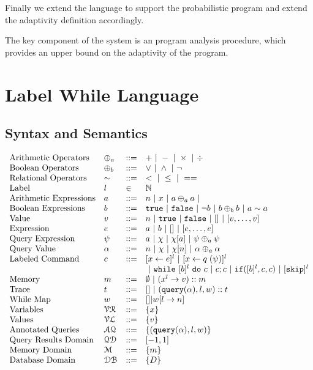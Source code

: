 \documentclass[a4paper,11pt]{article}
\begin{document}
Finally we extend the language to support the probabilistic program and extend the adaptivity definition accordingly.


The key component of the system is an program analysis procedure, which provides an upper bound on the adaptivity of the program.

\section{Label While Language}
\label{sec:while_language}
%
\subsection{Syntax and Semantics}
%
\[
\begin{array}{llll}
 \mbox{Arithmetic Operators} & \oplus_a & ::= & + ~|~ - ~|~ \times 
%
~|~ \div \\  
  \mbox{Boolean Operators} & \oplus_b & ::= & \lor ~|~ \land ~|~ \neg\\
   \mbox{Relational Operators} & \sim & ::= & < ~|~ \leq ~|~ == \\  
   \mbox{Label} & l & \in &  \mathbb{N}  \\  
\mbox{Arithmetic Expressions} & \aexpr & ::= & 
	n ~|~ x ~|~ \aexpr \oplus_a \aexpr ~|~ \\
\mbox{Boolean Expressions} & \bexpr & ::= & 
	\etrue ~|~ \efalse  ~|~ \neg \bexpr
	 ~|~ \bexpr \oplus_b \bexpr
	~|~ \aexpr \sim \aexpr \\
%
\mbox{Value} 
& v & ::= & { n \sep \etrue \sep \efalse ~|~ [] ~|~ [v, \dots, v]}  
\\
%
\mbox{Expression} 
& \expr & ::= & {\aexpr \sep \bexpr ~|~ [] ~|~ [\expr, \dots, \expr]} 
\\
%
\mbox{Query Expression} 
& \qexpr & ::= 
& { \aexpr ~|~ \chi ~|~ \chi[\aexpr] ~|~ \qexpr \oplus_a \qexpr} 
\\
%
\mbox{Query Value} & \qval & ::= 
& { n ~|~ \chi ~|~ \chi[n] ~|~ \qval \oplus_a  \qval }
\\
\mbox{{Labeled Command}} & c & ::= 
	&   [\assign x \expr]^{l} ~|~  [\assign x q(\qexpr)]^{l}
	\\
 	& & & ~|~  \ewhile ~ [b]^l ~ \edo ~ c  ~|~ c;c  ~|~ \eif([\bexpr]^l, c, c) 	 ~|~ [\eskip]^{l} 
 \\
\mbox{Memory} 
& m & ::= & \emptyset ~|~ (x^{l} \to v) :: m 
\\
%
\mbox{Trace} 
& t & ::= & [] ~|~ {{( \query(\qval), l, w) :: t}} 
\\
%
\mbox{While Map}
& w & ::= & {[] |  w[l \to n]}
\\
%
\mbox{Variables} 
& \mathcal{VR}  & ::= & \{ x \}
\\ 
%
\mbox{Values} 
& \mathcal{VL}  & ::= & \{ v \}
\\ 
%
\mbox{Annotated Queries} & \mathcal{AQ}  & 
::= & {\{( \query(\qval), l, w) \} } 
\\
%
\mbox{{Query Results Domain}}
& \qdom & ::= & {[-1,1]}
\\
%
\mbox{{Memory Domain}}
& \memdom & ::= & {\{m\}}
\\
%
\mbox{{Database Domain}}
& \dbdom & ::= & {\{D\}}
\end{array}
\]
%
%
\end{document}
